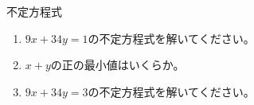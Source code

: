 \documentclass[12pt,a4paper]{jsarticle}
\begin{document}
不定方程式
\begin{enumerate}
    \item $9x+34y=1$の不定方程式を解いてください。
    \item $x+y$の正の最小値はいくらか。
    \item $9x+34y=3$の不定方程式を解いてください。
\end{enumerate}
\end{document}
